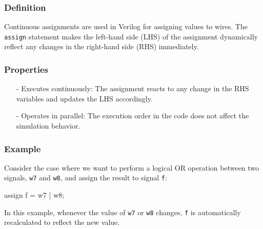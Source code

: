 \documentclass[12pt,openany, tikz,border=10pt]{book}
\begin{document}
\subsubsection*{Definition}
Continuous assignments are used in Verilog for assigning values to wires. The \texttt{assign} statement makes the left-hand side (LHS) of the assignment dynamically reflect any changes in the right-hand side (RHS) immediately.

\subsubsection*{Properties}
\begin{itemize}
    \item[-] Executes continuously: The assignment reacts to any change in the RHS variables and updates the LHS accordingly.
    \item[-] Operates in parallel: The execution order in the code does not affect the simulation behavior.
\end{itemize}

\subsubsection*{Example}
Consider the case where we want to perform a logical OR operation between two signals, \texttt{w7} and \texttt{w8}, and assign the result to signal \texttt{f}:

\begin{vhdl}
assign f = w7 | w8;
\end{vhdl}

In this example, whenever the value of \texttt{w7} or \texttt{w8} changes, \texttt{f} is automatically recalculated to reflect the new value.
\end{document}
